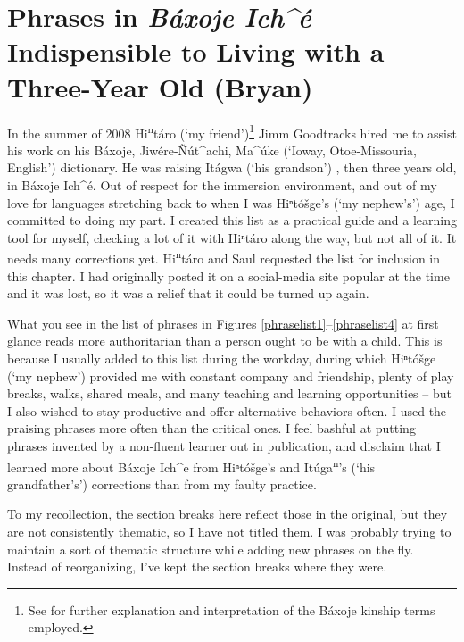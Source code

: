 \documentclass[output=paper]{LSP/langsci}
\begin{document}
\section{Phrases in \emph{B\'axoje Ich\^{ }\'e} Indispensible to Living with a Three-Year Old (Bryan)}
	In the summer of 2008 Hi\textsuperscript{n}t\'aro (`my friend')\footnote{See  for further explanation and interpretation of the Báxoje kinship terms employed.} Jimm Goodtracks hired me to assist his work on his B\'axoje, Jiw\'ere-\~N\'ut\^{ }achi, Ma\^{ }\'uke (`Ioway, Otoe-Missouria, English') dictionary. He was raising It\'agwa (`his grandson') , then three years old, in B\'axoje Ich\^{ }\'e. Out of respect for the immersion environment, and out of my love for languages stretching back to when I was Hiⁿtóšge's (`my nephew's') age, I committed to doing my part. I created this list as a practical guide and a learning tool for myself, checking a lot of it with Hiⁿtáro along the way, but not all of it. It needs many corrections yet. Hi\textsuperscript{n}t\'aro and Saul requested the list for inclusion in this chapter. I had originally posted it on a social-media site popular at the time and it was lost, so it was a relief that it could be turned up again. 

What you see in the list of phrases in Figures \ref{phraselist1}--\ref{phraselist4} at first glance reads more authoritarian than a person ought to be with a child. This is because I usually added to this list during the workday, during which Hiⁿtóšge (`my nephew') provided me with constant company and friendship, plenty of play breaks, walks, shared meals, and many teaching and learning opportunities -- but I also wished to stay productive and offer alternative behaviors often. I used the praising phrases more often than the critical ones. I feel bashful at putting phrases invented by a non-fluent learner out in publication, and disclaim that I learned more about B\'axoje Ich\^{ }e from Hiⁿtóšge's and It\'uga\textsuperscript{n}'s (`his grandfather's') corrections than from my faulty practice. 

To my recollection, the section breaks here reflect those in the original, but they are not consistently thematic, so I have not titled them. I was probably trying to maintain a sort of thematic structure while adding new phrases on the fly. Instead of reorganizing, I've kept the section breaks where they were.
\end{document}
